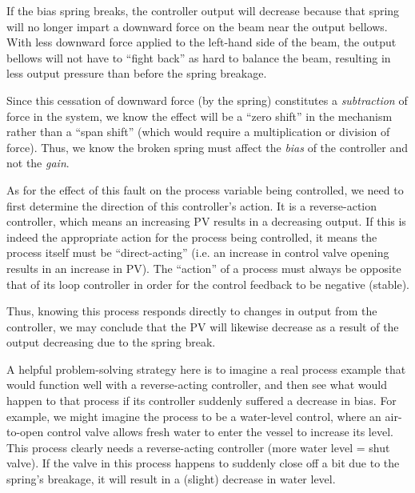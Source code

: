 \vskip 10pt

If the bias spring breaks, the controller output will decrease because that spring will no longer impart a downward force on the beam near the output bellows.  With less downward force applied to the left-hand side of the beam, the output bellows will not have to ``fight back'' as hard to balance the beam, resulting in less output pressure than before the spring breakage.

Since this cessation of downward force (by the spring) constitutes a {\it subtraction} of force in the system, we know the effect will be a ``zero shift'' in the mechanism rather than a ``span shift'' (which would require a multiplication or division of force).  Thus, we know the broken spring must affect the {\it bias} of the controller and not the {\it gain}.

\vskip 10pt

As for the effect of this fault on the process variable being controlled, we need to first determine the direction of this controller's action.  It is a reverse-action controller, which means an increasing PV results in a decreasing output.  If this is indeed the appropriate action for the process being controlled, it means the process itself must be ``direct-acting'' (i.e. an increase in control valve opening results in an increase in PV).  The ``action'' of a process must always be opposite that of its loop controller in order for the control feedback to be negative (stable).

Thus, knowing this process responds directly to changes in output from the controller, we may conclude that the PV will likewise decrease as a result of the output decreasing due to the spring break.

A helpful problem-solving strategy here is to imagine a real process example that would function well with a reverse-acting controller, and then see what would happen to that process if its controller suddenly suffered a decrease in bias.  For example, we might imagine the process to be a water-level control, where an air-to-open control valve allows fresh water to enter the vessel to increase its level.  This process clearly needs a reverse-acting controller (more water level = shut valve).  If the valve in this process happens to suddenly close off a bit due to the spring's breakage, it will result in a (slight) decrease in water level.




